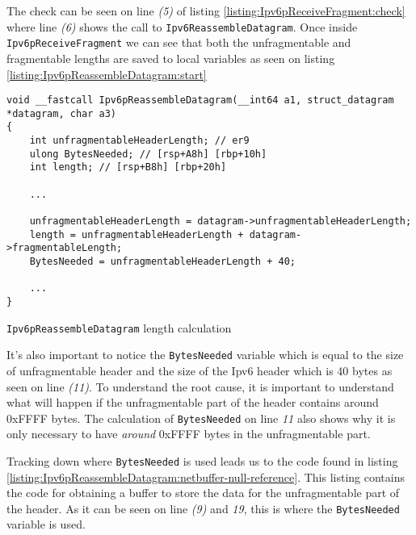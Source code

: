 \documentclass{report}
\begin{document}
The check can be seen on line \emph{(5)} of listing \ref{listing:Ipv6pReceiveFragment:check} where line \emph{(6)} shows the call to \texttt{Ipv6ReassembleDatagram}. Once inside \texttt{Ipv6pReceiveFragment} we can see that both the unfragmentable and fragmentable lengths are saved to local variables as seen on listing \ref{listing:Ipv6pReassembleDatagram:start}

\begin{listing}[H]
\begin{verbatim}
void __fastcall Ipv6pReassembleDatagram(__int64 a1, struct_datagram *datagram, char a3)
{
    int unfragmentableHeaderLength; // er9
    ulong BytesNeeded; // [rsp+A8h] [rbp+10h]
    int length; // [rsp+B8h] [rbp+20h]

    ...

    unfragmentableHeaderLength = datagram->unfragmentableHeaderLength;
    length = unfragmentableHeaderLength + datagram->fragmentableLength;
    BytesNeeded = unfragmentableHeaderLength + 40;

    ...
}
\end{verbatim}
\caption{\texttt{Ipv6pReassembleDatagram} length calculation}
\label{listing:Ipv6pReassembleDatagram:start}
\end{listing}

It's also important to notice the \texttt{BytesNeeded} variable which is equal to the size of unfragmentable header and the size of the Ipv6 header which is 40 bytes as seen on line \emph{(11)}. To understand the root cause, it is important to understand what will happen if the unfragmentable part of the header contains around 0xFFFF bytes. The calculation of \texttt{BytesNeeded} on line \emph{11} also shows why it is only necessary to have \emph{around} 0xFFFF bytes in the unfragmentable part.

Tracking down where \texttt{BytesNeeded} is used leads us to the code found in listing \ref{listing:Ipv6pReassembleDatagram:netbuffer-null-reference}. This listing contains the code for obtaining a buffer to store the data for the unfragmentable part of the header. As it can be seen on line \emph{(9)} and \emph{19}, this is where the \texttt{BytesNeeded} variable is used.
\end{document}
